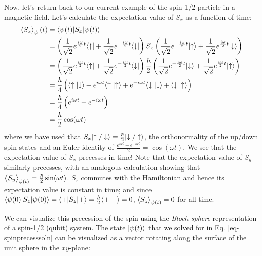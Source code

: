 Now, let's return back to our current example of the spin-1/2 particle in a magnetic field. Let's calculate the expectation value of $S_x$ as a function of time:
\begin{equation}
    \begin{split}
        \left< S_x \right>_\psi(t) &= \langle \psi(t) \rvert S_x\lvert \psi(t) \rangle
        \\ &= \left(\frac{1}{\sqrt{2}}e^{\frac{i\omega}{2}t}\langle \uparrow \rvert + \frac{1}{\sqrt{2}}e^{-\frac{i\omega}{2} t}\langle \downarrow \rvert\right)S_x\left(\frac{1}{\sqrt{2}}e^{-\frac{i\omega}{2}t}\lvert \uparrow \rangle + \frac{1}{\sqrt{2}}e^{\frac{i\omega}{2} t}\lvert \downarrow \rangle\right)
        \\ &= \left(\frac{1}{\sqrt{2}}e^{\frac{i\omega}{2}t}\langle \uparrow \rvert + \frac{1}{\sqrt{2}}e^{-\frac{i\omega}{2} t}\langle \downarrow \rvert\right)\frac{\hbar}{2}\left(\frac{1}{\sqrt{2}}e^{-\frac{i\omega}{2}t}\lvert \downarrow \rangle + \frac{1}{\sqrt{2}}e^{\frac{i\omega}{2} t}\lvert \uparrow \rangle\right)
        \\ &= \frac{\hbar}{4}\left(\langle \uparrow \lvert \downarrow \rangle + e^{i\omega t}\langle \uparrow \lvert \uparrow \rangle + e^{-i\omega t}\langle \downarrow \lvert \downarrow \rangle + \langle \downarrow \lvert \uparrow \rangle\right)
        \\ &= \frac{\hbar}{4}\left(e^{i\omega t} + e^{-i\omega t}\right)
        \\ &= \frac{\hbar}{2}\cos(\omega t)
    \end{split}
\end{equation}
where we have used that $S_x\lvert \uparrow/\downarrow \rangle = \frac{\hbar}{2}\lvert \downarrow/\uparrow \rangle$, the orthonormality of the up/down spin states and an Euler identity of $\frac{e^{i\omega t} + e^{-i\omega t}}{2} = \cos(\omega t)$. We see that the expectation value of $S_x$ precesses in time! Note that the expectation value of $S_y$ similarly precesses, with an analogous calculation showing that $\left< S_y \right>_{\psi(t)} = \frac{\hbar}{2}\sin(\omega t)$. $S_z$ commutes with the Hamiltonian and hence its expectation value is constant in time; and since $\langle \psi(0) \rvert S_z\lvert \psi(0) \rangle = \langle + \rvert S_z\lvert + \rangle = \frac{\hbar}{2}\langle + \lvert - \rangle = 0$, $\left< S_z \right>_{\psi(t)} = 0$ for all time.

We can visualize this precession of the spin using the \emph{Bloch sphere} representation of a spin-1/2 (qubit) system. The state $\lvert \psi(t) \rangle$ that we solved for in Eq. \eqref{eq-spinprecesssoln} can be visualized as a vector rotating along the surface of the unit sphere in the $xy$-plane:

